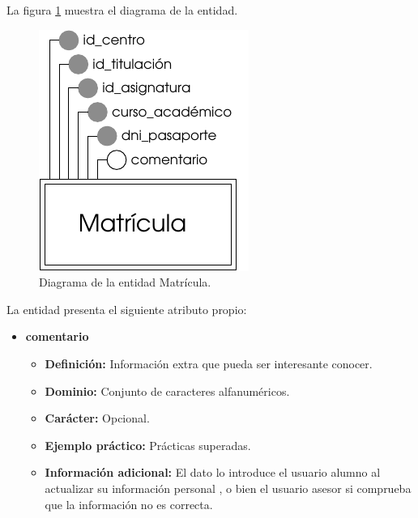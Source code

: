 \begin{description}
   \item[Diagrama] La figura \ref{diagramaMatricula} muestra el diagrama de la entidad.
   \item \begin{figure}[!ht]
            \begin{center}
            \includegraphics[]{07.Modelo_Entidad-Interrelacion/7.2.Analisis_Entidades/diagramas/matricula.pdf}
            \caption{Diagrama de la entidad Matrícula.}
            \label{diagramaMatricula}
            \end{center}
         \end{figure}

   \item[Descripción de los atributos propios] La entidad presenta el
   siguiente atributo propio:

   \begin{itemize}
    \item \textbf{comentario}
    \begin{itemize}
      \item \textbf{Definición:} Información extra que pueda ser
      interesante conocer.
      \item \textbf{Dominio:} Conjunto de caracteres alfanuméricos.
      \item \textbf{Carácter:} Opcional.
      \item \textbf{Ejemplo práctico:} Prácticas superadas.
      \item \textbf{Información adicional:} El dato lo introduce el
      usuario alumno al actualizar su información personal , o
      bien el usuario asesor si comprueba que la información no es
      correcta.
    \end{itemize}
   \end{itemize}


\end{description}
